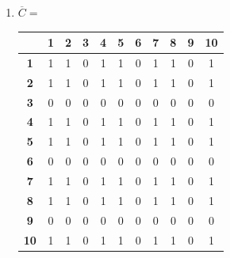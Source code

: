 \documentclass[a4paper,14pt]{extarticle}
\begin{document}
\begin{enumerate}[label=1.\arabic*.]
\begin{enumerate}[1) ]
\begin{tabular}{|c|c|c|c|c|c|c|c|c|c|c|}
			            \hline
		            \end{tabular}
		      \item $\overline{C} = $  \begin{tabular}{|c|c|c|c|c|c|c|c|c|c|c|}
			            \hline
			                              & \textbf{1} & \textbf{2} & \textbf{3} & \textbf{4} & \textbf{5} & \textbf{6} & \textbf{7} & \textbf{8} & \textbf{9} & \textbf{10} \\
			            \hline\textbf{1}  & 1          & 1          & 0          & 1          & 1          & 0          & 1          & 1          & 0          & 1           \\
			            \hline\textbf{2}  & 1          & 1          & 0          & 1          & 1          & 0          & 1          & 1          & 0          & 1           \\
			            \hline\textbf{3}  & 0          & 0          & 0          & 0          & 0          & 0          & 0          & 0          & 0          & 0           \\
			            \hline\textbf{4}  & 1          & 1          & 0          & 1          & 1          & 0          & 1          & 1          & 0          & 1           \\
			            \hline\textbf{5}  & 1          & 1          & 0          & 1          & 1          & 0          & 1          & 1          & 0          & 1           \\
			            \hline\textbf{6}  & 0          & 0          & 0          & 0          & 0          & 0          & 0          & 0          & 0          & 0           \\
			            \hline\textbf{7}  & 1          & 1          & 0          & 1          & 1          & 0          & 1          & 1          & 0          & 1           \\
			            \hline\textbf{8}  & 1          & 1          & 0          & 1          & 1          & 0          & 1          & 1          & 0          & 1           \\
			            \hline\textbf{9}  & 0          & 0          & 0          & 0          & 0          & 0          & 0          & 0          & 0          & 0           \\
			            \hline\textbf{10} & 1          & 1          & 0          & 1          & 1          & 0          & 1          & 1          & 0          & 1           \\
			            \hline
		            \end{tabular}

\end{enumerate}
\end{enumerate}
\end{document}
